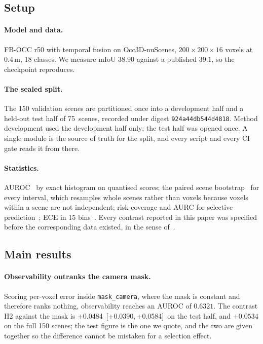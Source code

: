 \documentclass[10pt,twocolumn,letterpaper]{article}
\newcommand{\Hii}{+0.0484}
\newcommand{\HiiCI}{[+0.0390,\,+0.0584]}
\newcommand{\nScenes}{75}
\newcommand{\splitdigest}{\texttt{924a44db544d4818}}
\begin{document}
\subsection{Setup}
\paragraph{Model and data.}
FB-OCC r50 with temporal fusion on Occ3D-nuScenes, $200\times200\times16$
voxels at 0.4\,m, 18 classes. We measure mIoU $38.90$ against a
published $39.1$, so the checkpoint reproduces.

\paragraph{The sealed split.}
The 150 validation scenes are partitioned once into a development half and
a held-out test half of \nScenes\ scenes, recorded under digest
\splitdigest. Method development used the development half only; the test
half was opened once. A single module is the source of truth for the
split, and every script and every CI gate reads it from there.

\paragraph{Statistics.}
AUROC~\cite{hanley1982roc} by exact histogram on quantised scores; the
paired scene bootstrap~\cite{efron1986bootstrap} for every interval, which
resamples whole scenes rather than voxels because voxels within a scene are
not independent; risk-coverage and AURC for selective
prediction~\cite{elyaniv2010selective, geifman2017selective}; ECE in 15
bins~\cite{naeini2015ece}. Every contrast reported in this paper was
specified before the corresponding data existed, in the sense
of~\cite{nosek2018preregistration}.

\subsection{Main results}
\label{sec:main}

\paragraph{Observability outranks the camera mask.}
\label{sec:h2}
Scoring per-voxel error inside \texttt{mask\_camera}, where the mask is
constant and therefore ranks nothing, observability reaches an AUROC of
$0.6321$. The contrast H2 against the mask is
\Hii\ \HiiCI\ on the test half, and $+0.0534$ on the full 150 scenes; the
test figure is the one we quote, and the two are given together so the
difference cannot be mistaken for a selection effect.
\end{document}
